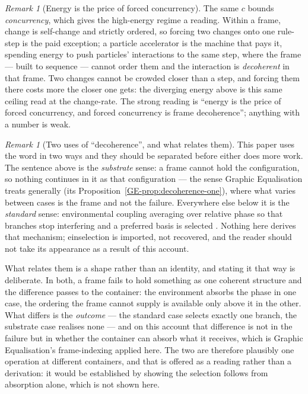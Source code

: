 \documentclass[11pt,a4paper]{article}
\theoremstyle{remark}\newtheorem{remark}[definition]{Remark}
\begin{document}
\begin{remark}[Energy is the price of forced concurrency]\label{rem:forced-concurrency}
The same $c$ bounds \emph{concurrency}, which gives the high-energy regime a
reading. Within a frame, change is self-change and strictly ordered, so forcing
two changes onto one rule-step is the paid exception; a particle accelerator is
the machine that pays it, spending energy to push particles' interactions to the
same step, where the frame --- built to sequence --- cannot order them and the
interaction is \emph{decoherent} in that frame. Two changes cannot be crowded
closer than a step, and forcing them there costs more the closer one gets: the
diverging energy above is this same ceiling read at the change-rate. The strong
reading is ``energy is the price of forced concurrency, and forced concurrency is
frame decoherence''; anything with a number is weak.
\end{remark}

\begin{remark}[Two uses of ``decoherence'', and what relates them]\label{rem:two-decoherences}
This paper uses the word in two ways and they should be separated before either does more work. The
sentence above is the \emph{substrate} sense: a frame cannot hold the configuration, so nothing
continues in it as that configuration --- the sense Graphic Equalisation treats generally
(its Proposition~\ref{GE-prop:decoherence-one}), where what varies between cases is the frame and not
the failure. Everywhere
else below it is the \emph{standard} sense: environmental coupling averaging over relative phase so
that branches stop interfering and a preferred basis is selected \citep{zurek2003}. Nothing here
derives that mechanism; einselection is imported, not recovered, and the reader should not take its
appearance as a result of this account.

What relates them is a shape rather than an identity, and stating it that way is deliberate. In both,
a frame fails to hold something as one coherent structure and the difference passes to the container:
the environment absorbs the phase in one case, the ordering the frame cannot supply is available only
above it in the other. What differs is the \emph{outcome} --- the standard case selects exactly one
branch, the substrate case realises none --- and on this account that difference is not in the failure
but in whether the container can absorb what it receives, which is Graphic Equalisation's frame-indexing
applied here. The two are therefore plausibly one operation at different containers, and that is
offered as a reading rather than a derivation: it would be established by showing the selection
follows from absorption alone, which is not shown here.
\end{remark}
\end{document}
